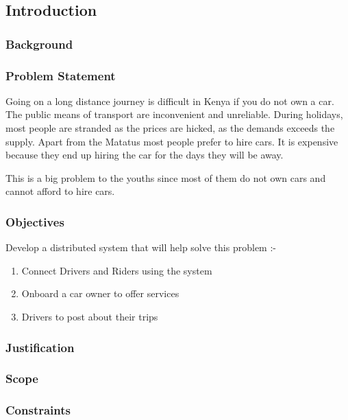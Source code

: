 \documentclass{article}
\begin{document}
\subsection{Introduction}

\subsubsection{Background}

\subsubsection{Problem Statement}

Going on a long distance journey is difficult in Kenya if you do not own a car. The public means of transport are inconvenient and unreliable. During holidays, most people are stranded as the prices are hicked, as the demands exceeds the supply. Apart from the Matatus most people prefer to hire cars. It is expensive because they end up hiring the car for the days they will be away.

This is a big problem to the youths since most of them do not own cars and cannot afford to hire cars.

\subsubsection{Objectives}

Develop a distributed system that will help solve this problem :-

\begin{enumerate}
    \item Connect Drivers and Riders using the system
    \item Onboard a car owner to offer services
    \item Drivers to post about their trips
\end{enumerate}


\subsubsection{Justification}

\subsubsection{Scope}

\subsubsection{Constraints}
\end{document}

